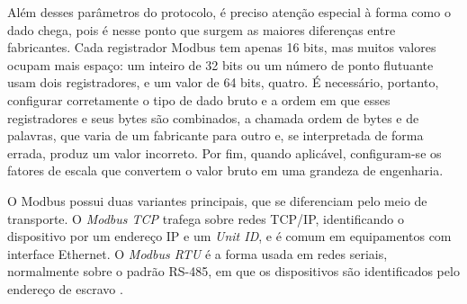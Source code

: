 \par Além desses parâmetros do protocolo, é preciso atenção especial à forma como o dado chega, pois é nesse ponto que surgem as maiores diferenças entre fabricantes. Cada registrador Modbus tem apenas 16 bits, mas muitos valores ocupam mais espaço: um inteiro de 32 bits ou um número de ponto flutuante usam dois registradores, e um valor de 64 bits, quatro. É necessário, portanto, configurar corretamente o tipo de dado bruto e a ordem em que esses registradores e seus bytes são combinados, a chamada ordem de bytes e de palavras, que varia de um fabricante para outro e, se interpretada de forma errada, produz um valor incorreto. Por fim, quando aplicável, configuram-se os fatores de escala que convertem o valor bruto em uma grandeza de engenharia.

\par O Modbus possui duas variantes principais, que se diferenciam pelo meio de transporte. O \emph{Modbus TCP} trafega sobre redes TCP/IP, identificando o dispositivo por um endereço IP e um \emph{Unit ID}, e é comum em equipamentos com interface Ethernet. O \emph{Modbus RTU} é a forma usada em redes seriais, normalmente sobre o padrão RS-485, em que os dispositivos são identificados pelo endereço de escravo \cite{MODBUS_SERIAL_SPEC}.
